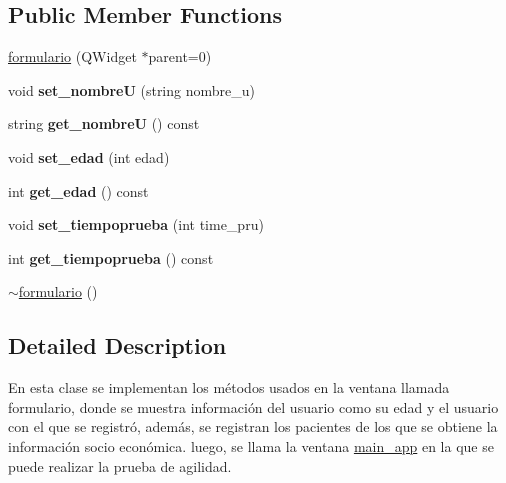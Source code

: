 \subsection*{Public Member Functions}
\begin{DoxyCompactItemize}
\item 
\hyperlink{classformulario_af34c9f3ab769a3ea16053537357a8eb2}{formulario} (Q\+Widget $\ast$parent=0)
\item 
\mbox{\label{classformulario_ace4314028085911340f58aa6cfcd24ee}} 
void {\bfseries set\+\_\+nombreU} (string nombre\+\_\+u)
\item 
\mbox{\label{classformulario_a7dcb6cc9155cf10057554d16d399ed12}} 
string {\bfseries get\+\_\+nombreU} () const
\item 
\mbox{\label{classformulario_a8978663040da6ee0a8f2b6add6c25618}} 
void {\bfseries set\+\_\+edad} (int edad)
\item 
\mbox{\label{classformulario_a885b709005659b381b5c94d3c1d48f85}} 
int {\bfseries get\+\_\+edad} () const
\item 
\mbox{\label{classformulario_a26dc6e41c551eaafbfcfa8bec0e69cd6}} 
void {\bfseries set\+\_\+tiempoprueba} (int time\+\_\+pru)
\item 
\mbox{\label{classformulario_ac78b4c701dd9da8ef7527d5eb69ef95c}} 
int {\bfseries get\+\_\+tiempoprueba} () const
\item 
\hyperlink{classformulario_a226d2ab871b8816ab3ca146f66e053b4}{$\sim$formulario} ()
\end{DoxyCompactItemize}


\subsection{Detailed Description}
En esta clase se implementan los métodos usados en la ventana llamada formulario, donde se muestra información del usuario como su edad y el usuario con el que se registró, además, se registran los pacientes de los que se obtiene la información socio económica. luego, se llama la ventana \hyperlink{classmain__app}{main\+\_\+app} en la que se puede realizar la prueba de agilidad. 

